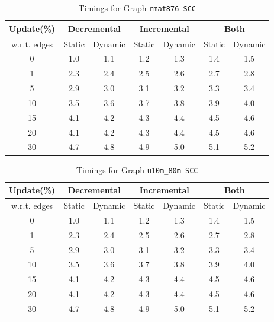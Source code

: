 \begin{table}[H]
    \centering
    \caption{Timings for Graph \texttt{rmat876-SCC} }
    \begin{tabular}{|c|c|c|c|c|c|c|}
        \hline
        \textbf{Update(\%)} & \multicolumn{2}{c|}{\textbf{Decremental}} & \multicolumn{2}{c|}{\textbf{Incremental}} & \multicolumn{2}{c|}{\textbf{Both}} \\
        \hline
        w.r.t. edges & Static &  Dynamic & Static & Dynamic & Static & Dynamic \\
        \hline
        0 & 1.0 & 1.1 & 1.2 & 1.3 & 1.4 & 1.5 \\
        1 & 2.3 & 2.4 & 2.5 & 2.6 & 2.7 & 2.8 \\
        5 & 2.9 & 3.0 & 3.1 & 3.2 & 3.3 & 3.4 \\
        10 & 3.5 & 3.6 & 3.7 & 3.8 & 3.9 & 4.0 \\
        15 & 4.1 & 4.2 & 4.3 & 4.4 & 4.5 & 4.6 \\
        20 & 4.1 & 4.2 & 4.3 & 4.4 & 4.5 & 4.6 \\
        30 & 4.7 & 4.8 & 4.9 & 5.0 & 5.1 & 5.2 \\
        \hline
    \end{tabular}
    \label{tab:timed_results_g7}
\end{table}


\begin{table}[H]
    \centering
    \caption{Timings for Graph \texttt{u10m\_80m-SCC} }
    \begin{tabular}{|c|c|c|c|c|c|c|}
        \hline
        \textbf{Update(\%)} & \multicolumn{2}{c|}{\textbf{Decremental}} & \multicolumn{2}{c|}{\textbf{Incremental}} & \multicolumn{2}{c|}{\textbf{Both}} \\
        \hline
        w.r.t. edges & Static &  Dynamic & Static & Dynamic & Static & Dynamic \\
        \hline
        0 & 1.0 & 1.1 & 1.2 & 1.3 & 1.4 & 1.5 \\
        1 & 2.3 & 2.4 & 2.5 & 2.6 & 2.7 & 2.8 \\
        5 & 2.9 & 3.0 & 3.1 & 3.2 & 3.3 & 3.4 \\
        10 & 3.5 & 3.6 & 3.7 & 3.8 & 3.9 & 4.0 \\
        15 & 4.1 & 4.2 & 4.3 & 4.4 & 4.5 & 4.6 \\
        20 & 4.1 & 4.2 & 4.3 & 4.4 & 4.5 & 4.6 \\
        30 & 4.7 & 4.8 & 4.9 & 5.0 & 5.1 & 5.2 \\
        \hline
    \end{tabular}
    \label{tab:timed_results_g8}
\end{table}

